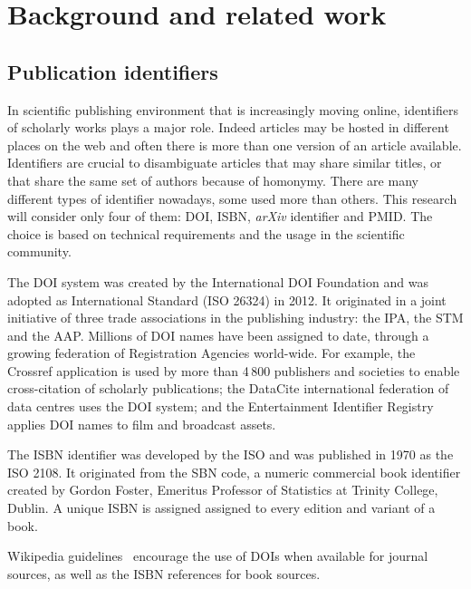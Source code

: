 
\chapter{Background and related work}
\label{cha:background}

\section{Publication identifiers}
\label{sec:Publication identifiers}
In scientific publishing environment that is increasingly moving online, identifiers of scholarly works plays a major role.
Indeed articles may be hosted in different places on the web and often there is more than one version of an article available.
Identifiers are crucial to disambiguate articles that may share similar titles, or that  share the same set of authors because of homonymy.
There are many different types of identifier nowadays, some used more than others.
This research will consider only four of them: \acs{DOI}, \acs{ISBN}, \emph{arXiv} identifier and \acs{PMID}.
The choice is based on technical requirements and the usage in the scientific community.

The \acf{DOI} system was created by the International DOI Foundation and was adopted as International Standard (ISO 26324) in 2012.
It originated in a joint initiative of three trade associations in the publishing industry: the \acf{IPA}, the \acf{STM} and the \acf{AAP}.
Millions of \ac{DOI} names have been assigned to date, through a growing federation of Registration Agencies world-wide.
For example, the Crossref application is used by more than 4\,800 publishers and societies to enable cross-citation of scholarly publications; the DataCite international federation of data centres uses the \ac{DOI} system; and the Entertainment Identifier Registry applies \ac{DOI} names to film and broadcast assets.

The \acf{ISBN} identifier was developed by the \acf{ISO} and was published in 1970 as the ISO 2108.
It originated from the \ac{SBN} code, a numeric commercial book identifier created by Gordon Foster, Emeritus Professor of Statistics at Trinity College, Dublin.
A unique \ac{ISBN} is assigned assigned to every edition and variant of a book.

Wikipedia guidelines~\cite{wiki:doi_guideline} encourage the use of \acp{DOI} when available for journal sources, as well as the \ac{ISBN} references for book sources.


